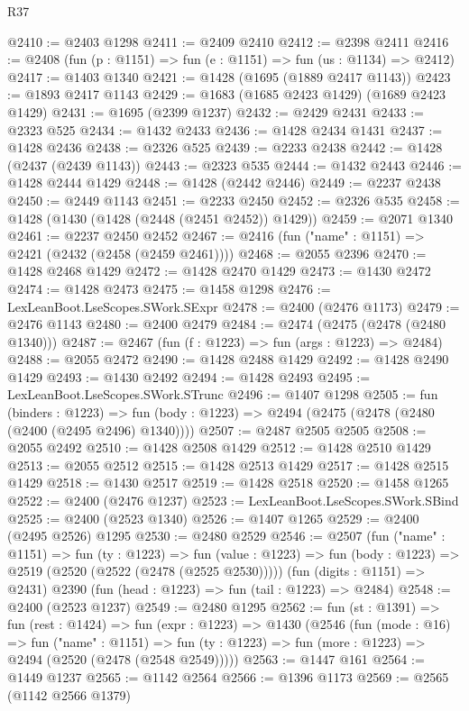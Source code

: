 \begin{lexlean}{R37}
\begin{coremodule}
@2410 := @2403 @1298
@2411 := @2409 @2410
@2412 := @2398 @2411
@2416 := @2408 (fun (p : @1151) => fun (e : @1151) => fun (us : @1134) => @2412)
@2417 := @1403 @1340
@2421 := @1428 (@1695 (@1889 @2417 @1143))
@2423 := @1893 @2417 @1143
@2429 := @1683 (@1685 @2423 @1429) (@1689 @2423 @1429)
@2431 := @1695 (@2399 @1237)
@2432 := @2429 @2431
@2433 := @2323 @525
@2434 := @1432 @2433
@2436 := @1428 @2434 @1431
@2437 := @1428 @2436
@2438 := @2326 @525
@2439 := @2233 @2438
@2442 := @1428 (@2437 (@2439 @1143))
@2443 := @2323 @535
@2444 := @1432 @2443
@2446 := @1428 @2444 @1429
@2448 := @1428 (@2442 @2446)
@2449 := @2237 @2438
@2450 := @2449 @1143
@2451 := @2233 @2450
@2452 := @2326 @535
@2458 := @1428 (@1430 (@1428 (@2448 (@2451 @2452)) @1429))
@2459 := @2071 @1340
@2461 := @2237 @2450 @2452
@2467 := @2416 (fun ("name" : @1151) => @2421 (@2432 (@2458 (@2459 @2461))))
@2468 := @2055 @2396
@2470 := @1428 @2468 @1429
@2472 := @1428 @2470 @1429
@2473 := @1430 @2472
@2474 := @1428 @2473
@2475 := @1458 @1298
@2476 := LexLeanBoot.LseScopes.SWork.SExpr
@2478 := @2400 (@2476 @1173)
@2479 := @2476 @1143
@2480 := @2400 @2479
@2484 := @2474 (@2475 (@2478 (@2480 @1340)))
@2487 := @2467 (fun (f : @1223) => fun (args : @1223) => @2484)
@2488 := @2055 @2472
@2490 := @1428 @2488 @1429
@2492 := @1428 @2490 @1429
@2493 := @1430 @2492
@2494 := @1428 @2493
@2495 := LexLeanBoot.LseScopes.SWork.STrunc
@2496 := @1407 @1298
@2505 := fun (binders : @1223) =>
  fun (body : @1223) => @2494 (@2475 (@2478 (@2480 (@2400 (@2495 @2496) @1340))))
@2507 := @2487 @2505 @2505
@2508 := @2055 @2492
@2510 := @1428 @2508 @1429
@2512 := @1428 @2510 @1429
@2513 := @2055 @2512
@2515 := @1428 @2513 @1429
@2517 := @1428 @2515 @1429
@2518 := @1430 @2517
@2519 := @1428 @2518
@2520 := @1458 @1265
@2522 := @2400 (@2476 @1237)
@2523 := LexLeanBoot.LseScopes.SWork.SBind
@2525 := @2400 (@2523 @1340)
@2526 := @1407 @1265
@2529 := @2400 (@2495 @2526) @1295
@2530 := @2480 @2529
@2546 := @2507
    (fun ("name" : @1151) =>
    fun (ty : @1223) =>
    fun (value : @1223) => fun (body : @1223) => @2519 (@2520 (@2522 (@2478 (@2525 @2530)))))
    (fun (digits : @1151) => @2431)
    @2390
    (fun (head : @1223) => fun (tail : @1223) => @2484)
@2548 := @2400 (@2523 @1237)
@2549 := @2480 @1295
@2562 := fun (st : @1391) =>
  fun (rest : @1424) =>
  fun (expr : @1223) =>
  @1430
    (@2546
      (fun (mode : @16) =>
      fun ("name" : @1151) =>
      fun (ty : @1223) => fun (more : @1223) => @2494 (@2520 (@2478 (@2548 @2549)))))
@2563 := @1447 @161
@2564 := @1449 @1237
@2565 := @1142 @2564
@2566 := @1396 @1173
@2569 := @2565 (@1142 @2566 @1379)

\end{coremodule}
\end{lexlean}
